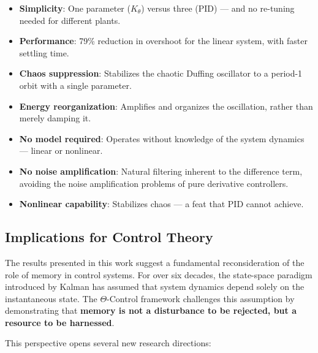 \documentclass[12pt,a4paper]{article}
\begin{document}
\begin{itemize}
    \item \textbf{Simplicity}: One parameter ($K_\theta$) versus 
    three (PID) — and no re-tuning needed for different plants.
    
    \item \textbf{Performance}: 79\% reduction in overshoot for 
    the linear system, with faster settling time.
    
    \item \textbf{Chaos suppression}: Stabilizes the chaotic 
    Duffing oscillator to a period-1 orbit with a single parameter.
    
    \item \textbf{Energy reorganization}: Amplifies and organizes 
    the oscillation, rather than merely damping it.
    
    \item \textbf{No model required}: Operates without knowledge 
    of the system dynamics — linear or nonlinear.
    
    \item \textbf{No noise amplification}: Natural filtering 
    inherent to the difference term, avoiding the noise 
    amplification problems of pure derivative controllers.
    
    \item \textbf{Nonlinear capability}: Stabilizes chaos — a 
    feat that PID cannot achieve.
\end{itemize}

\subsection{Implications for Control Theory}

The results presented in this work suggest a fundamental 
reconsideration of the role of memory in control systems. 
For over six decades, the state-space paradigm introduced by 
Kalman has assumed that system dynamics depend solely on the 
instantaneous state. The $\Theta$-Control framework challenges 
this assumption by demonstrating that \textbf{memory is not a 
disturbance to be rejected, but a resource to be harnessed}.

This perspective opens several new research directions:
\end{document}
